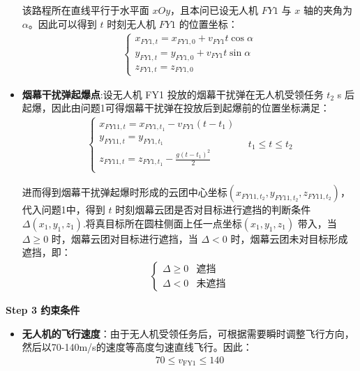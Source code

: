 \documentclass[../main.tex]{subfiles}
\begin{document}
\begin{itemize}
\par 该路程所在直线平行于水平面 \( xOy \)，且本问已设无人机 \( FY1 \) 与 \( x \) 轴的夹角为 \( \alpha \)。因此可以得到 \( t \) 时刻无人机 \( FY1 \) 的位置坐标：
\begin{align}\label{10.3}
  \begin{cases}
x_{FY1,t} = x_{FY1,0} + v_{FY1} t \cos\alpha \\
y_{FY1,t} = y_{FY1,0} + v_{FY1} t \sin\alpha \\
z_{FY1,t} = z_{FY1,0}
\end{cases}
\end{align}
\item \textbf{烟幕干扰弹起爆点}:设无人机 FY1 投放的烟幕干扰弹在无人机受领任务 \( t_2 \) s 后起爆，因此由问题1可得烟幕干扰弹在投放后到起爆前的位置坐标满足：
\begin{align}\label{10.4}
    \begin{cases}
x_{FY11,t}=x_{FY1,t_1}-v_{FY1}\left( t-t_1 \right)\\
	y_{FY11,t}=y_{FY1,t_1}\\
	z_{FY11,t}=z_{FY1,t_1}-\frac{g\left( t-t_1 \right) ^2}{2}\\
\end{cases}
\quad t_1 \leq t \leq t_2
\end{align}
\par 进而得到烟幕干扰弹起爆时形成的云团中心坐标$\left( x_{FY11,t_2},y_{FY11,t_2},z_{FY11,t_2} \right)$，代入问题1中，得到 $t$ 时刻烟幕云团是否对目标进行遮挡的判断条件$\Delta \left( x_1,y_1,z_1 \right) $.将真目标所在圆柱侧面上任一点坐标$(x_1, y_1, z_1)$ 带入，当 $\Delta \geq 0$ 时，烟幕云团对目标进行遮挡，当 $\Delta < 0$ 时，烟幕云团未对目标形成遮挡，即：
\begin{align}
\begin{cases}
\Delta \geq 0 & \text{遮挡} \\
\Delta < 0 & \text{未遮挡}
\end{cases}
\end{align}\label{10.7}
\end{itemize}

\textbf{Step 3 约束条件}
\begin{itemize}
\item \textbf{无人机的飞行速度}：由于无人机受领任务后，可根据需要瞬时调整飞行方向，然后以70-140m/s的速度等高度匀速直线飞行。因此：
\begin{align}\label{10.8}
  70 \leq v_{\text{FY1}} \leq 140
\end{align}
\end{itemize}
\end{document}
